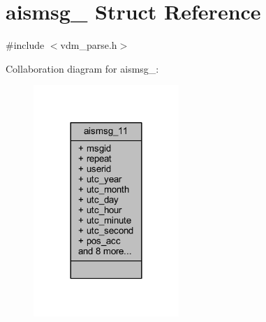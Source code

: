 \hypertarget{structaismsg__11}{}\section{aismsg\+\_ Struct Reference}
\label{structaismsg__11}


{\ttfamily \#include $<$vdm\+\_\+parse.\+h$>$}



Collaboration diagram for aismsg\+\_\+:
\nopagebreak
\begin{figure}[H]
\begin{center}
\leavevmode
\includegraphics[width=156pt]{structaismsg__11__coll__graph}
\end{center}
\end{figure}

